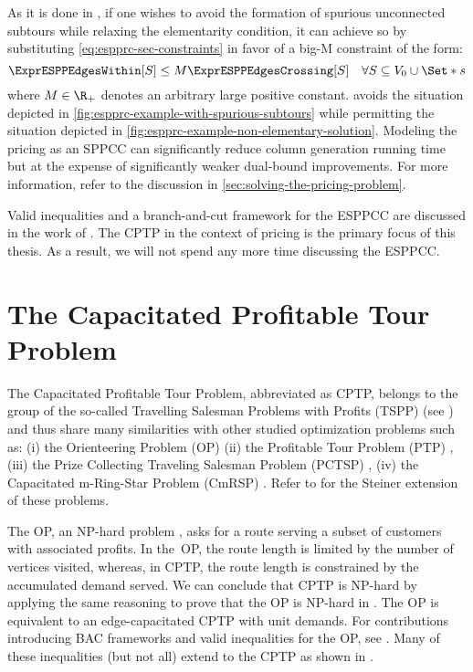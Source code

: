 As it is done in \textcite{beasley1989},
if one wishes to avoid the formation of spurious unconnected subtours
while relaxing the elementarity condition,
it can achieve so by substituting \cref{eq:espprc-sec-constraints} in favor
of a big-M constraint of the form:
\begin{equation}
	\label{eq:espprc-relaxed-elementarity}
	\ExprESPPEdgesWithin[S] \le M \ExprESPPEdgesCrossing[S] \quad \forall S \subseteq V_0 \cup \Set*{s}
\end{equation}
where $M \in \R_+$ denotes an arbitrary large positive constant.
 avoids the situation depicted
in \cref{fig:espprc-example-with-spurious-subtours}
while permitting the situation depicted in \cref{fig:espprc-example-non-elementary-solution}.
Modeling the pricing as an SPPCC can significantly reduce column generation running time
but at the expense of significantly weaker dual-bound improvements.
For more information, refer to the discussion in \cref{sec:solving-the-pricing-problem}.

Valid inequalities and a branch-and-cut framework for the ESPPCC
are discussed in the work of \textcite{jepsen2008branchandcut}.
The CPTP in the context of pricing is the primary focus of this thesis.
As a result, we will not spend any more time discussing the ESPPCC.

\section{The Capacitated Profitable Tour Problem}
\label{sec:the-capacitated-profitable-tour-problem}

The Capacitated Profitable Tour Problem, abbreviated as CPTP,
belongs to the group of the so-called
Travelling Salesman Problems with Profits (TSPP) (see \cite{feillet2005}) and thus share many similarities with other
studied optimization problems such as:
(i) the Orienteering Problem (OP) \parencite{golden1987, laporte1990}
(ii) the Profitable Tour Problem (PTP) \parencite{dellamico1995},
(iii) the Prize Collecting Traveling Salesman Problem (PCTSP) \parencite{balas1989prize, balas1995prize},
(iv) the Capacitated m-Ring-Star Problem (CmRSP) \parencite{baldacci2007capacitated}.
Refer to \textcite{letchford2013} for the Steiner extension of these problems.

The OP, an NP-hard problem \parencite{laporte1990}, asks for a route serving
a subset of customers with associated profits.
In the OP, the route length is limited by the number of vertices visited,
whereas, in CPTP,
the route length is constrained by the accumulated demand served.
We can conclude that CPTP is NP-hard by applying the same reasoning
to prove that the OP is NP-hard in \textcite{laporte1990}.
The OP is equivalent to an edge-capacitated CPTP with unit demands.
For contributions introducing BAC frameworks and valid inequalities for the OP,
see \textcite{fischetti1998, gendreau1998}.
Many of these inequalities (but not all) extend to the CPTP as shown in \textcite{jepsen2014}.

